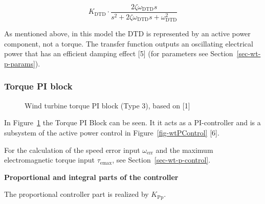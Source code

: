 \documentclass[
  a4paper,
  DIV=11,
  numbers=noendperiod]{scrartcl}
\begin{document}
\[
K_{\text{DTD}} \cdot \frac{2 \zeta \omega_{\text{DTD}} s}{s^2 + 2 \zeta \omega_{\text{DTD}} s + \omega_{\text{DTD}}^2}
\]

As mentioned above, in this model the DTD is represented by an active
power component, not a torque. The transfer function outputs an
oscillating electrical power that has an efficient damping effect
{[}5{]} (for parameters see Section~\ref{sec-wt-p-params}).

\subsubsection{Torque PI block}\label{sec-torque-pi}

\begin{figure}


\caption{\label{fig-torquePi}Wind turbine torque PI block (Type 3),
based on {[}1{]}}

\end{figure}%

In Figure~\ref{fig-torquePi} the Torque PI Block can be seen. It it acts
as a PI-controller and is a subsystem of the active power control in
Figure~\ref{fig-wtPControl} {[}6{]}.

For the calculation of the speed error input \(\omega_\mathrm{err}\) and
the maximum electromagnetic torque input \(\tau_\mathrm{emax}\), see
Section~\ref{sec-wt-p-control}.

\textbf{Proportional and integral parts of the controller}

The proportional controller part is realized by \(K_\mathrm{Pp}\).
\end{document}
